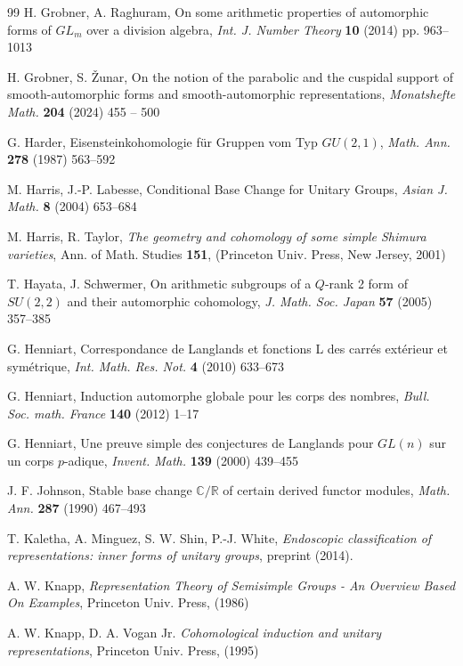 \documentclass[a4paper,10pt]{amsart}
\theoremstyle{definition}
\numberwithin{equation}{section}
\def\R{\mathbb R}
\def\C{\mathbb C}
\begin{document}
\begin{thebibliography}{99}
 H. Grobner, A. Raghuram, On some arithmetic properties of automorphic forms of $GL_m$ over a division algebra, {\it Int. J. Number Theory} {\bf 10} (2014) pp. 963--1013


 H. Grobner, S. \v Zunar, On the notion of the parabolic and the cuspidal support of smooth-automorphic forms and smooth-automorphic representations, {\it Monatshefte Math.} {\bf 204} (2024) 455 -- 500 


 G. Harder, Eisensteinkohomologie für Gruppen vom Typ $GU(2,1)$, {\it Math. Ann.} {\bf 278} (1987) 563--592


 M. Harris, J.-P. Labesse, Conditional Base Change for Unitary Groups, {\it Asian J. Math.} {\bf 8} (2004) 653--684


 M. Harris, R. Taylor, {\it The geometry and cohomology of some simple Shimura varieties}, Ann. of Math. Studies {\bf 151}, (Princeton Univ. Press, New Jersey, 2001)


 T. Hayata, J. Schwermer, On arithmetic subgroups of a $Q$-rank 2 form of $SU(2,2)$ and their automorphic cohomology, {\it J. Math. Soc. Japan} {\bf 57} (2005) 357--385 


 G. Henniart, Correspondance de Langlands et fonctions L des carr\'es ext\'erieur et sym\'etrique, {\it Int. Math. Res. Not.}  {\bf 4} (2010) 633--673

 G. Henniart, Induction automorphe globale pour les corps des nombres, {\it Bull. Soc. math. France} {\bf 140} (2012) 1--17

 G. Henniart, Une preuve simple des conjectures de Langlands pour $GL(n)$ sur un corps $p$-adique, {\it Invent. Math.} \textbf{139} (2000) 439--455

 J. F. Johnson, Stable base change $\C/\R$ of certain derived functor modules, {\it Math. Ann.} {\bf 287} (1990) 467--493

 T. Kaletha, A. Minguez, S. W. Shin, P.-J. White, {\it Endoscopic classification of representations: inner forms of unitary groups}, preprint (2014).

 A. W. Knapp, \emph{Representation Theory of Semisimple Groups - An Overview Based On Examples}, Princeton Univ. Press, (1986)


 A. W. Knapp, D. A. Vogan Jr. \emph{Cohomological induction and unitary representations}, Princeton Univ. Press, (1995)


\end{thebibliography}
\end{document}
